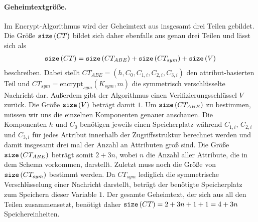 \paragraph{Geheimtextgröße.}
Im Encrypt-Algorithmus wird der Geheimtext aus insgesamt drei Teilen gebildet.
Die Größe $\texttt{size}\left( CT \right)$ bildet sich daher ebenfalls aus genau drei Teilen und lässt
sich als
\begin{align*}
	\texttt{size}\left( CT \right) = \texttt{size}\left( CT_{ABE} \right) + \texttt{size}\left( CT_{sym} \right) + \texttt{size}\left( V \right)
\end{align*}
beschreiben. Dabei stellt $CT_{ABE} = \left( h, C_0, C_{1,i}, C_{2,i},
C_{3,i} \right)$ den at\-tri\-but-ba\-sier\-ten Teil und $CT_{sym} =
\text{encrypt}_{sym}\left(K_{sym}, m\right)$ die symmetrisch ver\-schlüs\-selte
Nachricht dar. Außerdem gibt der Algorithmus einen Verifizierungsschlüssel $V$
zurück. Die Größe $\texttt{size}\left( V \right)$ beträgt damit $1$. Um $\texttt{size}\left( CT_{ABE} \right)$ zu
bestimmen, müssen wir uns die einzelnen Komponenten genauer anschauen. Die
Komponenten $h$ und $C_0$ benötigen jeweils einen Speicherplatz während
$C_{1,i}$, $C_{2,i}$ und $C_{3,i}$ für jedes Attribut innerhalb der
Zugriffsstruktur berechnet werden und damit insgesamt drei mal der Anzahl an
Attributen groß sind. Die Größe $\texttt{size}\left( CT_{ABE} \right)$ beträgt somit $2 + 3n$,
wobei $n$ die Anzahl aller Attribute, die in dem Schema vorkommen, darstellt.
Zuletzt muss noch die Größe von $\texttt{size}\left( CT_{sym} \right)$ bestimmt werden. Da
$CT_{sym}$ lediglich die symmetrische Verschlüsselung einer Nachricht darstellt,
beträgt der benötigte Speicherplatz zum Speichern dieser Variable $1$. Der
gesamte Geheimtext, der sich aus all den Teilen zusammensetzt, benötigt daher
$\texttt{size}\left( CT \right) = 2 + 3n + 1 + 1 = 4 + 3n$ Speichereinheiten.

